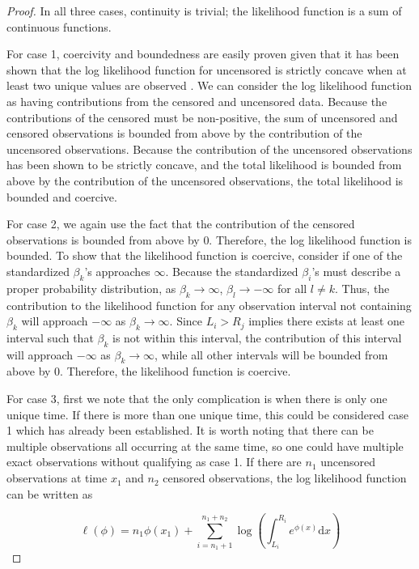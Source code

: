 	\begin{proof}
	
	In all three cases, continuity is trivial; the likelihood function is a sum of continuous functions. 
	
	For case 1, coercivity and boundedness are easily proven given that it has been shown that the log likelihood function for uncensored is strictly concave when at least two unique values are observed \cite{RefRuf2006}. We can consider the log likelihood function as having contributions from the censored and uncensored data. Because the contributions of the censored must be non-positive, the sum of uncensored and censored observations is bounded from above by the contribution of the uncensored observations. Because the contribution of the uncensored observations has been shown to be strictly concave, and the total likelihood is bounded from above by the contribution of the uncensored observations, the total likelihood is bounded and coercive. 
	
	For case 2, we again use the fact that the contribution of the censored observations is bounded from above by 0. Therefore, the log likelihood function is bounded. To show that the likelihood function is coercive, consider if one of the standardized $\beta_k$'s approaches $\infty$. Because the standardized $\beta_i$'s must describe a proper probability distribution, as $\beta_k \rightarrow \infty$, $\beta_l \rightarrow -\infty$ for all $l \neq k$. Thus, the contribution to the likelihood function for any observation interval not containing $\beta_k$ will approach $-\infty$ as $\beta_k \rightarrow \infty$. Since $L_i > R_j$ implies there exists at least one interval such that $\beta_k$ is not within this interval, the contribution of this interval will approach $-\infty$ as $\beta_k \rightarrow \infty$, while all other intervals will be bounded from above by 0. Therefore, the likelihood function is coercive. 
	
	For case 3, first we note that the only complication is when there is only one unique time. If there is more than one unique time, this could be considered case 1 which has already been established. It is worth noting that there can be multiple observations all occurring at the same time, so one could have multiple exact observations without qualifying as case 1. If there are $n_1$ uncensored observations at time $x_1$ and $n_2$ censored observations, the log likelihood function can be written as
	
	\[
	\ell (\phi) = \displaystyle  n_1\phi(x_1) + \sum_{i = n_1+ 1} ^{n_1 + n_2} \log \left( \int_{L_i}^{R_i} e^{\phi(x) } \mathrm{d}x \right)
	\]
	

\end{proof}
